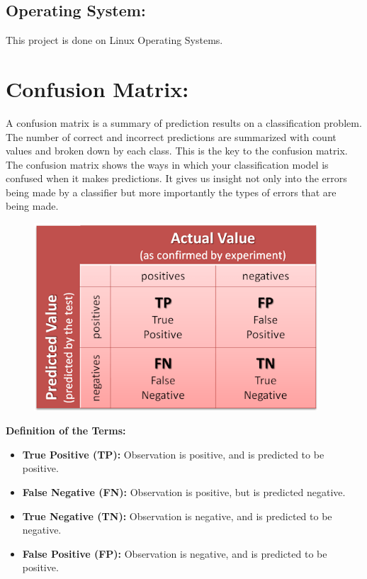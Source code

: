 \documentclass{report}
\begin{document}
\subsection{Operating System: }
This project is done on Linux Operating Systems.


\section{Confusion Matrix: }
A confusion matrix is a summary of prediction results on a classification problem.
The number of correct and incorrect predictions are summarized with count values and broken down by each class. This is the key to the confusion matrix.
The confusion matrix shows the ways in which your classification model is confused when it makes predictions.
It gives us insight not only into the errors being made by a classifier but more importantly the types of errors that are being made.

\begin{figure}[htbp]
\centering
\includegraphics[height=7cm]{Pictures/confusion_matrix.png}
\caption{}
\label{}
\end{figure}

\textbf{Definition of the Terms: }
\begin{itemize}
\item \textbf{True Positive (TP):} Observation is positive, and is predicted to be positive.
\item \textbf{False Negative (FN):} Observation is positive, but is predicted negative.
\item \textbf{True Negative (TN):} Observation is negative, and is predicted to be negative.
\item \textbf{False Positive (FP):} Observation is negative, and is predicted to be positive.
\end{itemize}
\end{document}
